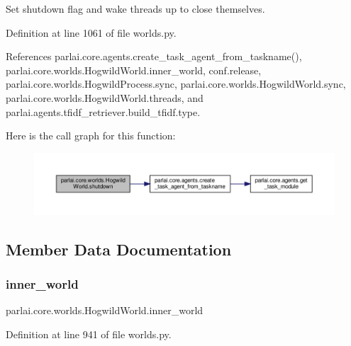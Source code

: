 \begin{DoxyVerb}Set shutdown flag and wake threads up to close themselves.\end{DoxyVerb}
 

Definition at line 1061 of file worlds.\+py.



References parlai.\+core.\+agents.\+create\+\_\+task\+\_\+agent\+\_\+from\+\_\+taskname(), parlai.\+core.\+worlds.\+Hogwild\+World.\+inner\+\_\+world, conf.\+release, parlai.\+core.\+worlds.\+Hogwild\+Process.\+sync, parlai.\+core.\+worlds.\+Hogwild\+World.\+sync, parlai.\+core.\+worlds.\+Hogwild\+World.\+threads, and parlai.\+agents.\+tfidf\+\_\+retriever.\+build\+\_\+tfidf.\+type.

Here is the call graph for this function\+:
\nopagebreak
\begin{figure}[H]
\begin{center}
\leavevmode
\includegraphics[width=350pt]{classparlai_1_1core_1_1worlds_1_1HogwildWorld_a3960deb08a179884b1eea2e423437db2_cgraph}
\end{center}
\end{figure}


\subsection{Member Data Documentation}
\mbox{\label{classparlai_1_1core_1_1worlds_1_1HogwildWorld_a4138f2e9cd59f349ac7b737256faf383}} 
\subsubsection{\texorpdfstring{inner\+\_\+world}{inner\_world}}
{\footnotesize\ttfamily parlai.\+core.\+worlds.\+Hogwild\+World.\+inner\+\_\+world}



Definition at line 941 of file worlds.\+py.



